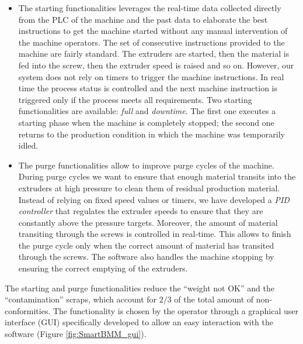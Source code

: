 \begin{itemize}
    \item The starting functionalities leverages the real-time data collected directly from the PLC of the machine and the past data to elaborate the best instructions to get the machine started without any manual intervention of the machine operators. The set of consecutive instructions provided to the machine are fairly standard. The extruders are started, then the material is fed into the screw, then the extruder speed is raised and so on. However, our system does not rely on timers to trigger the machine instructions. In real time the process status is controlled and the next machine instruction is triggered only if the process meets all requirements.
    Two starting functionalities are available: \textit{full} and \textit{downtime}. The first one executes a starting phase when the machine is completely stopped; the second one returns to the production condition in which the machine was temporarily idled.
    \item The purge functionalities allow to improve purge cycles of the machine.
    During purge cycles we want to ensure that enough material transits into the extruders at high pressure to clean them of residual production material. Instead of relying on fixed speed values or timers, we have developed a \textit{PID controller} that regulates the extruder speeds to ensure that they are constantly above the pressure targets. Moreover, the amount of material transiting through the screws is controlled in real-time. This allows to finish the purge cycle only when the correct amount of material has transited through the screws. The software also handles the machine stopping by ensuring the correct emptying of the extruders.     
\end{itemize}
%
The starting and purge functionalities reduce the ``weight not OK'' and the ``contamination'' scraps, which account for $2/3$ of the total amount of non-conformities.
The functionality is chosen by the operator through a graphical user interface (GUI) specifically developed to allow an easy interaction with the software (Figure \ref{fig:SmartBMM_gui}).
%

